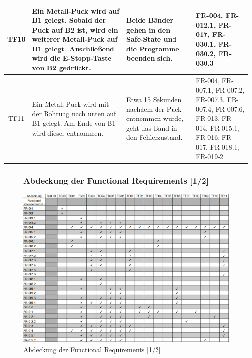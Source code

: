 \documentclass[oneside,a4paper,titlepage]{scrartcl}              %
\begin{document}
\begin{small}
\begin{center}
\begin{longtable}{|c|p{4cm}|p{6cm}|C{3cm}|}
      \hline
       TF10 & Ein Metall-Puck wird auf B1 gelegt. Sobald der Puck auf B2 ist, wird ein weiterer Metall-Puck auf B1 gelegt. Anschließend wird die E-Stopp-Taste von B2 gedrückt. & Beide Bänder gehen in den Safe-State und die Programme beenden sich. & FR-004, FR-012.1, FR-017, FR-030.1, FR-030.2, FR-030.3\\
      \hline
      TF11 & Ein Metall-Puck wird mit der Bohrung nach unten auf B1 gelegt. Am Ende von B1 wird dieser entnommen. & Etwa 15 Sekunden nachdem der Puck entnommen wurde, geht das Band in den Fehlerzustand. & FR-004, FR-007.1, FR-007.2, FR-007.3, FR-007.4, FR-007.6, FR-013, FR-014, FR-015.1, FR-016, FR-017, FR-018.1, FR-019-2\\
      \hline
    \end{longtable}
  \end{center}
\end{small}

\begin{figure}[p]
  \subsubsection{Abdeckung der Functional Requirements [1/2]}
  \centering\includegraphics[angle=90,scale=0.7]{imgs/Req_Test_Abdeckung_1.png}
  \caption{Abdeckung der Functional Requirements [1/2]}
\end{figure}
\end{document}
